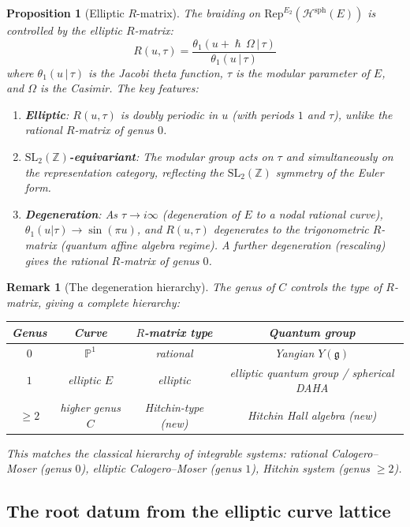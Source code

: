 \documentclass[11pt]{article}
\theoremstyle{garamondthm}
\newtheorem{proposition}[theorem]{Proposition}
\theoremstyle{garamonddef}
\theoremstyle{garamondrem}
\newtheorem{remark}[theorem]{Remark}
\newcommand{\Rep}{\mathrm{Rep}}
\newcommand{\Etwo}{E_2}
\newcommand{\cH}{\mathcal{H}}
\newcommand{\frakg}{\mathfrak{g}}
\renewcommand{\hbar}{\hslash}
\newcommand{\SL}{\mathrm{SL}}
\begin{document}
\begin{proposition}[Elliptic $R$-matrix]
\label{prop:elliptic-r-matrix}
The braiding on $\Rep^{\Etwo}(\cH^{\mathrm{sph}}(E))$ is controlled by the \emph{elliptic $R$-matrix}:
\[
 R(u, \tau) = \frac{\theta_1(u + \hbar \, \Omega \,|\, \tau)}{\theta_1(u \,|\, \tau)}
\]
where $\theta_1(u \,|\, \tau)$ is the Jacobi theta function, $\tau$ is the modular parameter of $E$, and $\Omega$ is the Casimir. The key features:
\begin{enumerate}[label=(\roman*)]
 \item \textbf{Elliptic}: $R(u, \tau)$ is doubly periodic in $u$ (with periods $1$ and $\tau$), unlike the rational $R$-matrix of genus $0$.
 \item \textbf{$\SL_2(\mathbb{Z})$-equivariant}: The modular group acts on $\tau$ and simultaneously on the representation category, reflecting the $\SL_2(\mathbb{Z})$ symmetry of the Euler form.
 \item \textbf{Degeneration}: As $\tau \to i\infty$ (degeneration of $E$ to a nodal rational curve), $\theta_1(u|\tau) \to \sin(\pi u)$, and $R(u, \tau)$ degenerates to the \emph{trigonometric $R$-matrix} (quantum affine algebra regime). A further degeneration (rescaling) gives the rational $R$-matrix of genus $0$.
\end{enumerate}
\end{proposition}

\begin{remark}[The degeneration hierarchy]
\label{rem:degeneration}
The genus of $C$ controls the type of $R$-matrix, giving a complete hierarchy:
\begin{center}
\begin{tabular}{c|c|c|c}
Genus & Curve & $R$-matrix type & Quantum group \\ \hline
$0$ & $\mathbb{P}^1$ & rational & Yangian $Y(\frakg)$ \\
$1$ & elliptic $E$ & elliptic & elliptic quantum group / spherical DAHA \\
$\geq 2$ & higher genus $C$ & Hitchin-type (new) & Hitchin Hall algebra (new)
\end{tabular}
\end{center}
This matches the classical hierarchy of integrable systems: rational Calogero--Moser (genus $0$), elliptic Calogero--Moser (genus $1$), Hitchin system (genus $\geq 2$).
\end{remark}

\subsection{The root datum from the elliptic curve lattice}
\label{ssec:elliptic-root-datum}
\end{document}
